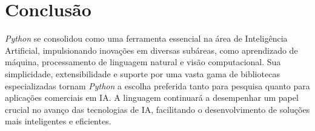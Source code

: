 \section{Conclusão}
\textit{Python} se consolidou como uma ferramenta essencial na área de Inteligência Artificial, impulsionando inovações em diversas subáreas, como aprendizado de máquina, processamento de linguagem natural e visão computacional. Sua simplicidade, extensibilidade e suporte por uma vasta gama de bibliotecas especializadas tornam \textit{Python} a escolha preferida tanto para pesquisa quanto para aplicações comerciais em IA. A linguagem continuará a desempenhar um papel crucial no avanço das tecnologias de IA, facilitando o desenvolvimento de soluções mais inteligentes e eficientes.